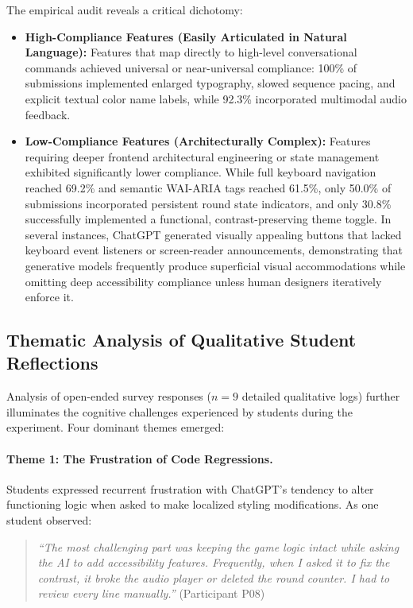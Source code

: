 \documentclass{cleiej}
\begin{document}
The empirical audit reveals a critical dichotomy:
\begin{itemize}[leftmargin=*]
    \item \textbf{High-Compliance Features (Easily Articulated in Natural Language):} Features that map directly to high-level conversational commands achieved universal or near-universal compliance: 100\% of submissions implemented enlarged typography, slowed sequence pacing, and explicit textual color name labels, while 92.3\% incorporated multimodal audio feedback.
    \item \textbf{Low-Compliance Features (Architecturally Complex):} Features requiring deeper frontend architectural engineering or state management exhibited significantly lower compliance. While full keyboard navigation reached 69.2\% and semantic WAI-ARIA tags reached 61.5\%, only 50.0\% of submissions incorporated persistent round state indicators, and only 30.8\% successfully implemented a functional, contrast-preserving theme toggle. In several instances, ChatGPT generated visually appealing buttons that lacked keyboard event listeners or screen-reader announcements, demonstrating that generative models frequently produce superficial visual accommodations while omitting deep accessibility compliance unless human designers iteratively enforce it.
\end{itemize}

\subsection{Thematic Analysis of Qualitative Student Reflections}
Analysis of open-ended survey responses ($n = 9$ detailed qualitative logs) further illuminates the cognitive challenges experienced by students during the experiment. Four dominant themes emerged:

\paragraph{Theme 1: The Frustration of Code Regressions.}
Students expressed recurrent frustration with ChatGPT's tendency to alter functioning logic when asked to make localized styling modifications. As one student observed:
\begin{quote}
\textit{``The most challenging part was keeping the game logic intact while asking the AI to add accessibility features. Frequently, when I asked it to fix the contrast, it broke the audio player or deleted the round counter. I had to review every line manually.''} (Participant P08)
\end{quote}
\end{document}
